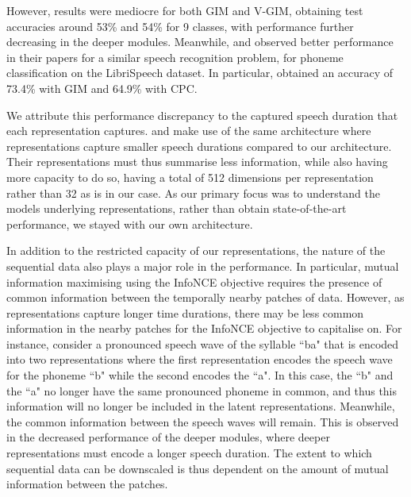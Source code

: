 		However, results were mediocre for both GIM and V-GIM, obtaining test accuracies around 53\% and 54\% for 9 classes, with performance further decreasing in the deeper modules. Meanwhile, \cite{oordRepresentationLearningContrastive2019} and \cite{lowePuttingEndEndtoEnd2020} observed better performance in their papers for a similar speech recognition problem, for phoneme classification on the LibriSpeech dataset. In particular, \citeauthor{lowePuttingEndEndtoEnd2020} obtained an accuracy of 73.4\% with GIM and 64.9\% with CPC.
		
		We attribute this performance discrepancy to the captured speech duration that each representation captures. \citeauthor{lowePuttingEndEndtoEnd2020} and \citeauthor{oordRepresentationLearningContrastive2019} make use of the same architecture where representations capture smaller speech durations compared to our architecture. Their representations must thus summarise less information, while also having more capacity to do so, having a total of 512 dimensions per representation rather than 32 as is in our case. As our primary focus was to understand the models underlying representations, rather than obtain state-of-the-art performance, we stayed with our own architecture.
		
		In addition to the restricted capacity of our representations, the nature of the sequential data also plays a major role in the performance. In particular, mutual information maximising using the InfoNCE objective requires the presence of common information between the temporally nearby patches of data. However, as representations capture longer time durations, there may be less common information in the nearby patches for the InfoNCE objective to capitalise on. For instance, consider a pronounced speech wave of the syllable ``ba" that is encoded into two representations where the first representation encodes the speech wave for the phoneme ``b" while the second encodes the ``a". In this case, the ``b" and the ``a" no longer have the same pronounced phoneme in common, and thus this information will no longer be included in the latent representations. Meanwhile, the common information between the speech waves will remain. This is observed in the decreased performance of the deeper modules, where deeper representations must encode a longer speech duration. The extent to which sequential data can be downscaled is thus dependent on the amount of mutual information between the patches.
		
